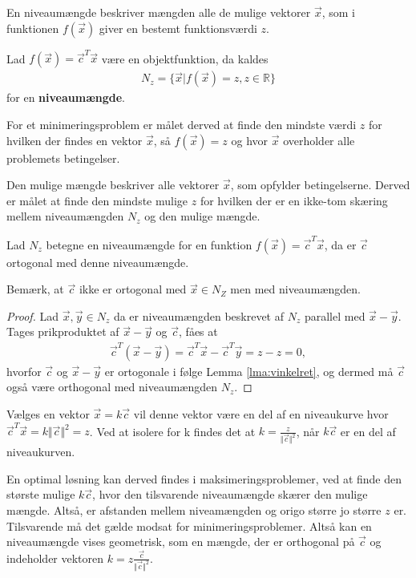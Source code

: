
En niveaumængde beskriver mængden alle de mulige vektorer $\vec{x}$, som i funktionen $f(\vec{x})$ giver en bestemt funktionsværdi $z$. 
\begin{defn}[Niveaumængde]
Lad $f(\vec{x})= \vec{c}^T\vec{x}$ være en objektfunktion, da kaldes
\begin{align*}
N_z = \{\vec{x}| f(\vec{x}) = z, z \in \mathds{R}\}
\end{align*}
for en \textbf{niveaumængde}.
\end{defn}

For et minimeringsproblem er målet derved at finde den mindste værdi $z$ for hvilken der findes en vektor $\vec{x}$, så $f(\vec{x})=z$ og hvor $\vec{x}$ overholder alle problemets betingelser.

Den mulige mængde beskriver alle vektorer $\vec{x}$, som opfylder betingelserne. Derved er målet at finde den mindste mulige $z$ for hvilken der er en ikke-tom skæring mellem niveaumængden $N_z$ og den mulige mængde.

\begin{stn}
Lad $N_z$ betegne en niveaumængde for en funktion $f(\vec{x})=\vec{c}^T\vec{x}$, da er $\vec{c}$ ortogonal med denne niveaumængde.
\end{stn}

Bemærk, at $\vec{c}$ ikke er ortogonal med $\vec{x}\in N_Z$ men med niveaumængden.
\begin{proof}
Lad $\vec{x}, \vec{y} \in N_z$ da er niveaumængden beskrevet af $N_z$ parallel med $\vec{x}-\vec{y}$.
Tages prikproduktet af $\vec{x}-\vec{y}$ og $\vec{c}$, fåes at
\begin{align*}
\vec{c}^T(\vec{x}-\vec{y}) = \vec{c}^T\vec{x} -\vec{c}^T\vec{y} = z - z = 0,
\end{align*}
hvorfor $\vec{c}$ og $\vec{x}-\vec{y}$ er ortogonale i følge Lemma \ref{lma:vinkelret}, og dermed må $\vec{c}$ også være orthogonal med niveaumængden $N_z$.
\end{proof}

Vælges en vektor $\vec{x}=k\vec{c}$ vil denne vektor være en del af en niveaukurve hvor $\vec{c}^T\vec{x}=k\Vert\vec{c}\Vert^2=z$. Ved at isolere for k findes det at $k=\frac{z}{\Vert\vec{c}\Vert^2}$, når $k\vec{c}$ er en del af niveaukurven.


En optimal løsning kan derved findes i maksimeringsproblemer, ved at finde den største mulige $k\vec{c}$, hvor den tilsvarende niveaumængde skærer den mulige mængde. Altså, er afstanden mellem niveamængden og origo større jo større $z$ er. Tilsvarende må det gælde modsat for minimeringsproblemer. 
Altså kan en niveaumængde vises geometrisk, som en mængde, der er orthogonal på $\vec{c}$ og indeholder vektoren $k=z\frac{\vec{c}}{\Vert\vec{c}\Vert^2}$.


